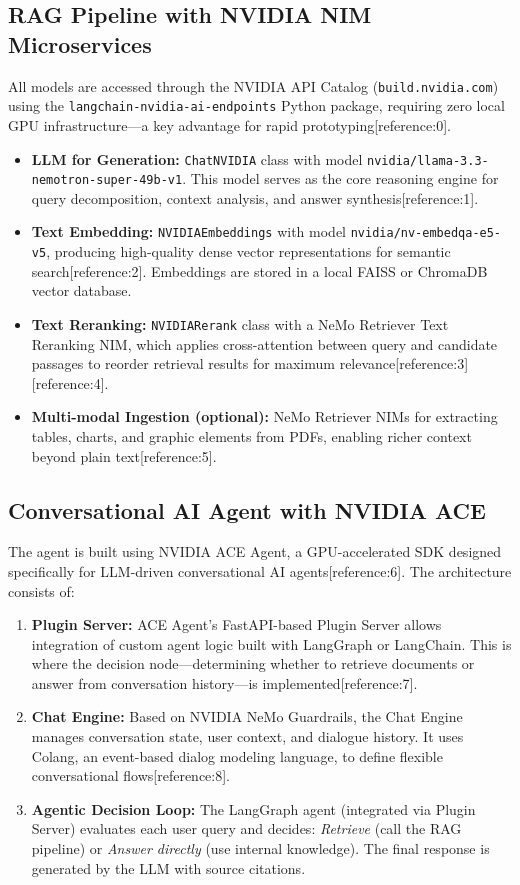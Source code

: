 \documentclass[a4paper,11pt]{article}
\begin{document}
\subsection{RAG Pipeline with NVIDIA NIM Microservices}
All models are accessed through the NVIDIA API Catalog (\texttt{build.nvidia.com}) using the \texttt{langchain-nvidia-ai-endpoints} Python package, requiring zero local GPU infrastructure---a key advantage for rapid prototyping[reference:0].

\begin{itemize}[noitemsep]
    \item \textbf{LLM for Generation:} \texttt{ChatNVIDIA} class with model \texttt{nvidia/llama-3.3-nemotron-super-49b-v1}. This model serves as the core reasoning engine for query decomposition, context analysis, and answer synthesis[reference:1].
    \item \textbf{Text Embedding:} \texttt{NVIDIAEmbeddings} with model \texttt{nvidia/nv-embedqa-e5-v5}, producing high-quality dense vector representations for semantic search[reference:2]. Embeddings are stored in a local FAISS or ChromaDB vector database.
    \item \textbf{Text Reranking:} \texttt{NVIDIARerank} class with a NeMo Retriever Text Reranking NIM, which applies cross-attention between query and candidate passages to reorder retrieval results for maximum relevance[reference:3][reference:4].
    \item \textbf{Multi-modal Ingestion (optional):} NeMo Retriever NIMs for extracting tables, charts, and graphic elements from PDFs, enabling richer context beyond plain text[reference:5].
\end{itemize}

\subsection{Conversational AI Agent with NVIDIA ACE}
The agent is built using NVIDIA ACE Agent, a GPU-accelerated SDK designed specifically for LLM-driven conversational AI agents[reference:6]. The architecture consists of:

\begin{enumerate}[noitemsep]
    \item \textbf{Plugin Server:} ACE Agent's FastAPI-based Plugin Server allows integration of custom agent logic built with LangGraph or LangChain. This is where the decision node—determining whether to retrieve documents or answer from conversation history—is implemented[reference:7].
    \item \textbf{Chat Engine:} Based on NVIDIA NeMo Guardrails, the Chat Engine manages conversation state, user context, and dialogue history. It uses Colang, an event-based dialog modeling language, to define flexible conversational flows[reference:8].
    \item \textbf{Agentic Decision Loop:} The LangGraph agent (integrated via Plugin Server) evaluates each user query and decides: \textit{Retrieve} (call the RAG pipeline) or \textit{Answer directly} (use internal knowledge). The final response is generated by the LLM with source citations.
\end{enumerate}
\end{document}
